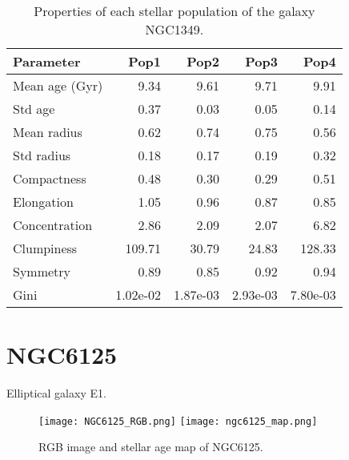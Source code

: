 \begin{table}[h]
\centering
\begin{tabular}{l|r|r|r|r}
Parameter & Pop1 & Pop2 & Pop3 & Pop4 \\\hline
Mean age (Gyr) & 9.34  & 9.61 & 9.71 & 9.91 \\
Std age & 0.37 & 0.03 & 0.05 & 0.14 \\
Mean radius & 0.62  & 0.74 & 0.75 & 0.56 \\
Std radius & 0.18 & 0.17 & 0.19 & 0.32 \\
Compactness & 0.48  & 0.30 & 0.29 & 0.51 \\
Elongation & 1.05  & 0.96 & 0.87 & 0.85 \\
Concentration & 2.86  & 2.09 & 2.07 & 6.82 \\
Clumpiness & 109.71  & 30.79 & 24.83 & 128.33 \\
Symmetry & 0.89 & 0.85 & 0.92 & 0.94 \\
Gini & 1.02e-02 & 1.87e-03 & 2.93e-03 & 7.80e-03 \\

\end{tabular}
\caption{\label{tab:widgets}Properties of each stellar population of the galaxy NGC1349.}
\end{table}


\newpage
\section*{NGC6125}
Elliptical galaxy E1.

\begin{figure}[bh]
\begin{center}
\texttt{[image: NGC6125\_RGB.png]}
\texttt{[image: ngc6125\_map.png]}
 \caption{RGB image and stellar age map of NGC6125.}
   \label{fig1}
\end{center}
\end{figure}

